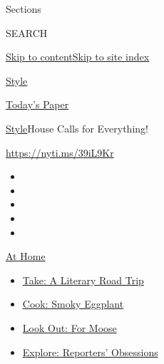 Sections

SEARCH

\protect\hyperlink{site-content}{Skip to
content}\protect\hyperlink{site-index}{Skip to site index}

\href{https://www.nytimes3xbfgragh.onion/section/style}{Style}

\href{https://myaccount.nytimes3xbfgragh.onion/auth/login?response_type=cookie\&client_id=vi}{}

\href{https://www.nytimes3xbfgragh.onion/section/todayspaper}{Today's
Paper}

\href{/section/style}{Style}\textbar{}House Calls for Everything!

\url{https://nyti.ms/39iL9Kr}

\begin{itemize}
\item
\item
\item
\item
\item
\end{itemize}

\href{https://www.nytimes3xbfgragh.onion/spotlight/at-home?action=click\&pgtype=Article\&state=default\&region=TOP_BANNER\&context=at_home_menu}{At
Home}

\begin{itemize}
\tightlist
\item
  \href{https://www.nytimes3xbfgragh.onion/2020/07/28/books/time-for-a-literary-road-trip.html?action=click\&pgtype=Article\&state=default\&region=TOP_BANNER\&context=at_home_menu}{Take:
  A Literary Road Trip}
\item
  \href{https://www.nytimes3xbfgragh.onion/2020/07/29/magazine/bored-with-your-home-cooking-some-smoky-eggplant-will-fix-that.html?action=click\&pgtype=Article\&state=default\&region=TOP_BANNER\&context=at_home_menu}{Cook:
  Smoky Eggplant}
\item
  \href{https://www.nytimes3xbfgragh.onion/2020/07/27/travel/moose-michigan-isle-royale.html?action=click\&pgtype=Article\&state=default\&region=TOP_BANNER\&context=at_home_menu}{Look
  Out: For Moose}
\item
  \href{https://www.nytimes3xbfgragh.onion/interactive/2020/at-home/even-more-reporters-editors-diaries-lists-recommendations.html?action=click\&pgtype=Article\&state=default\&region=TOP_BANNER\&context=at_home_menu}{Explore:
  Reporters' Obsessions}
\end{itemize}

